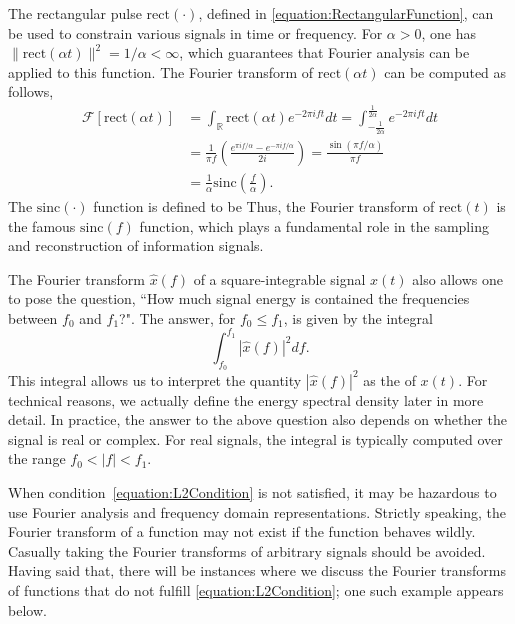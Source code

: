 \begin{example}
The rectangular pulse $\mathrm{rect} (\cdot)$, defined in \eqref{equation:RectangularFunction}, can be used to constrain various signals in time or frequency.
For $\alpha > 0$, one has $\| \mathrm{rect} (\alpha t) \|^2 = 1/\alpha < \infty$, which guarantees that Fourier analysis can be applied to this function.
The Fourier transform of $\mathrm{rect} (\alpha t)$ can be computed as follows,
\begin{equation*}
\begin{split}
\mathcal{F} \left[ \mathrm{rect} (\alpha t) \right]
&= \int_{\mathbb{R}} \mathrm{rect} (\alpha t) e^{- 2 \pi i f t} dt
= \int_{-\frac{1}{2\alpha}}^{\frac{1}{2\alpha}} e^{- 2 \pi i f t} dt \\
&= \frac{1}{\pi f} \left( \frac{e^{\pi i f/\alpha} - e^{- \pi i f/\alpha}}{2i} \right)
= \frac{ \sin ( \pi f/\alpha ) }{\pi f}  \\
&= \frac{1}{\alpha} \mathrm{sinc}\left( \frac{f}{\alpha} \right) .
\end{split}
\end{equation*}
The $\mathrm{sinc}(\cdot)$ function is defined to be
Thus, the Fourier transform of $\mathrm{rect}(t)$ is the famous $\mathrm{sinc}(f)$ function, which plays a fundamental role in the sampling and reconstruction of information signals.
\end{example}

The Fourier transform $\hat{x}(f)$ of a square-integrable signal $x(t)$ also allows one to pose the question, ``How much signal energy is contained the frequencies between $f_0$ and $f_1$?".
The answer, for $f_0 \leq f_1$, is given by the integral
\[ \int_{f_0}^{f_1} \left| \hat{x}(f) \right|^2 df. \]
This integral allows us to interpret the quantity $\left| \hat{x}(f) \right|^2$ as the  of $x(t)$.
For technical reasons, we actually define the energy spectral density later in more detail.
In practice, the answer to the above question also depends on whether the signal is real or complex.
For real signals, the integral is typically computed over the range $f_0 < |f| < f_1$.

When condition~\eqref{equation:L2Condition} is not satisfied, it may be hazardous to use Fourier analysis and frequency domain representations.
Strictly speaking, the Fourier transform of a function may not exist if the function behaves wildly.
Casually taking the Fourier transforms of arbitrary signals should be avoided.
Having said that, there will be instances where we discuss the Fourier transforms of functions that do not fulfill \eqref{equation:L2Condition};
one such example appears below.

